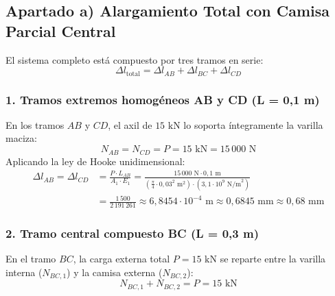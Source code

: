 \subsection{Apartado a) Alargamiento Total con Camisa Parcial Central}

El sistema completo está compuesto por tres tramos en serie:
\begin{equation}
    \Delta l_{\text{total}} = \Delta l_{AB} + \Delta l_{BC} + \Delta l_{CD}
\end{equation}

\subsubsection{1. Tramos extremos homogéneos AB y CD (L = 0,1 m)}

En los tramos $AB$ y $CD$, el axil de $15\text{ kN}$ lo soporta íntegramente la varilla maciza:
\begin{equation}
    N_{AB} = N_{CD} = P = 15\text{ kN} = 15\,000\text{ N}
\end{equation}
Aplicando la ley de Hooke unidimensional:
\begin{align}
    \Delta l_{AB} = \Delta l_{CD} &= \frac{P \cdot L_{AB}}{A_1 \cdot E_1} = \frac{15\,000\text{ N} \cdot 0{,}1\text{ m}}{\left(\frac{\pi}{4} \cdot 0{,}03^2\text{ m}^2\right) \cdot \left(3{,}1 \cdot 10^9\text{ N/m}^2\right)} \nonumber \\
    &= \frac{1\,500}{2\,191\,261} \approx 6{,}8454 \cdot 10^{-4}\text{ m} \approx 0{,}6845\text{ mm} \approx 0{,}68\text{ mm}
\end{align}

\subsubsection{2. Tramo central compuesto BC (L = 0,3 m)}

En el tramo $BC$, la carga externa total $P = 15\text{ kN}$ se reparte entre la varilla interna ($N_{BC,1}$) y la camisa externa ($N_{BC,2}$):
\begin{equation}
    N_{BC,1} + N_{BC,2} = P = 15\text{ kN} \label{eq:varilla_camisa_eq_estatica}
\end{equation}

